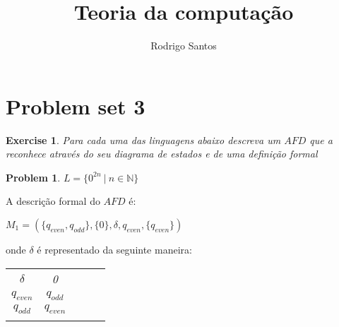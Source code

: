 \documentclass{article}
\title{Teoria da computação}
\author{Rodrigo Santos}
\begin{document}
\maketitle


\theoremstyle{plain}
\newtheorem{xca}{Exercise}
\theoremstyle{definition}
\newtheorem{prob}{Problem}

\section{Problem set 3}

\begin{xca}
  Para cada uma das linguagens abaixo descreva um $AFD$ que a reconhece através do seu diagrama de estados e de uma definição formal
\end{xca}

\begin{prob}
  $L = \{0^{2n} \ | \ n \in \mathbb{N}\}$

  \begin{center}
  \end{center}

  A descrição formal do $AFD$ é:
  \begin{center}
    $M_1 = (\{q_{even},q_{odd}\}, \{0\},\delta,q_{even}, \{q_{even}\})$
  \end{center}
  onde $\delta$ é representado da seguinte maneira:
  \begin{table}[htbp]
    \centering
    \begin{tabular}{cclll}
      \multicolumn{1}{c|}{\textit{$\delta$}}   & \textit{0}                    & \textit{} & \textit{} & \textit{} \\ \cline{1-2}
      \multicolumn{1}{c|}{\textit{$q_{even}$}} & \textit{$q_{odd}$}            & \textit{} & \textit{} & \textit{} \\
      \multicolumn{1}{c|}{\textit{$q_{odd}$}}  & \textit{$q_{even}$}           & \textit{} & \textit{} & \textit{} \\
      \multicolumn{1}{l}{\textit{}}            & \multicolumn{1}{l}{\textit{}} & \textit{} & \textit{} & \textit{}
    \end{tabular}
  \end{table}
\end{prob}
\end{document}
